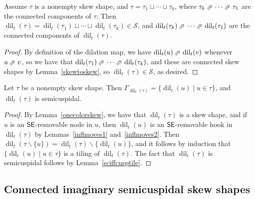 \documentclass[Unicode,ALCO]{cedram}
\newcommand{\infl}{\operatorname{dil}}
\newcommand{\SSSS}{\mathcal{S}}
\newcommand{\0}{{\bar 0}}
\newcommand{\NEarrow}{\mathbin{\rotatebox[origin=c]{45}{$\Rightarrow$}}}
\newcommand{\ssee}{{\sf SE}}
\begin{document}
\begin{lemma}\label{onecolorskew}
Assume \(\tau\) is a nonempty skew shape, and \(\tau = \tau_1 \sqcup \cdots \sqcup \tau_k\), where \(\tau_k \NEarrow \cdots \NEarrow \tau_1\) are the connected components of \(\tau\). Then \(\infl_t(\tau) = \infl_t(\tau_1) \sqcup \cdots \sqcup \infl_t(\tau_k) \in \SSSS\), and \(\infl_t(\tau_k) \NEarrow \cdots \NEarrow \infl_t(\tau_1)\) are the connected components of \(\infl_t(\tau)\).
\end{lemma}
\begin{proof}
By definition of the dilation map, we have \(\infl_t(u) \NEarrow \infl_t(v)\) whenever \(u \NEarrow v\), so we have that \(\infl_t(\tau_1) \NEarrow \cdots \NEarrow \infl_t(\tau_k)\), and these are connected skew shapes by Lemma~\ref{skewtoskew}, so \(\infl_t(\tau) \in \SSSS\), as desired.
\end{proof}

\begin{lemma}\label{deltile}
Let \(\tau\) be a nonempty skew shape.
Then 
\(\Gamma_{\infl_t(\tau)} = \{\infl_t(u) \mid u \in \tau\}\), and \(\infl_t(\tau)\) is semicuspidal.
\end{lemma}
\begin{proof}
By Lemma~\ref{onecolorskew}, we have that \(\infl_t(\tau)\) is a skew shape, and if \(u\) is an \(\ssee\)-removable node in \(u\), then \(\infl_t(u)\) is an \(\ssee\)-removable hook in \(\infl_t(\tau)\) by Lemmas~\ref{inflmoves1} and~\ref{inflmoves2}. Then \(\infl_t(\tau \backslash \{u\}) = \infl_t(\tau)\backslash\{\infl_t(u)\}\), and it follows by induction that \(\{\infl_t(u) \mid u \in \tau\}\) is a tiling of \(\infl_t(\tau)\). The fact that \(\infl_t(\tau)\) is semicuspidal follows by Lemma~\ref{sciffcusptile}.
\end{proof}


\subsection{Connected imaginary semicuspidal skew shapes}
\end{document}
